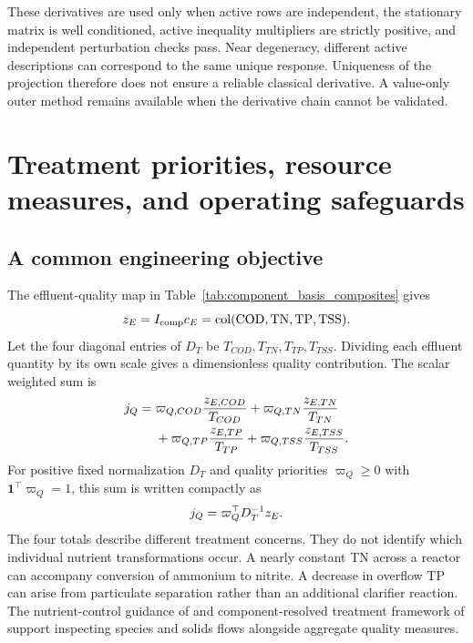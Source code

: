 These derivatives are used only when active rows are independent, the stationary matrix is well conditioned, active inequality multipliers are strictly positive, and independent perturbation checks pass. Near degeneracy, different active descriptions can correspond to the same unique response. Uniqueness of the projection therefore does not ensure a reliable classical derivative. A value-only outer method remains available when the derivative chain cannot be validated.

\section{Treatment priorities, resource measures, and operating safeguards}

\subsection{A common engineering objective}

The effluent-quality map in Table~\ref{tab:component_basis_composites} gives
\begin{equation}
\equationname{Effluent component-to-water-quality map}
z_E=I_{\rm comp}c_E=\operatorname{col}(\mathrm{COD},\mathrm{TN},\mathrm{TP},\mathrm{TSS}).
\end{equation}
Let the four diagonal entries of $D_T$ be $T_{COD},T_{TN},T_{TP},T_{TSS}$. Dividing each effluent quantity by its own scale gives a dimensionless quality contribution. The scalar weighted sum is
\begin{equation}
\equationname{Scalar expansion of the weighted effluent-quality objective}
\begin{aligned}
j_Q={}&\varpi_{Q,COD}\frac{z_{E,COD}}{T_{COD}}
+\varpi_{Q,TN}\frac{z_{E,TN}}{T_{TN}}\\
&+\varpi_{Q,TP}\frac{z_{E,TP}}{T_{TP}}
+\varpi_{Q,TSS}\frac{z_{E,TSS}}{T_{TSS}}.
\end{aligned}
\end{equation}
For positive fixed normalization $D_T$ and quality priorities $\varpi_Q\ge0$ with $\mathbf1^\top\varpi_Q=1$, this sum is written compactly as
\begin{equation}
\equationname{Vector form of the weighted effluent-quality objective}
j_Q=\varpi_Q^\top D_T^{-1}z_E.
\label{eq:plant_quality_objective}
\end{equation}
The four totals describe different treatment concerns. They do not identify which individual nutrient transformations occur. A nearly constant TN across a reactor can accompany conversion of ammonium to nitrite. A decrease in overflow TP can arise from particulate separation rather than an additional clarifier reaction. The nutrient-control guidance of \citet{USEPA2009} and component-resolved treatment framework of \citet{Zhang2026} support inspecting species and solids flows alongside aggregate quality measures.

